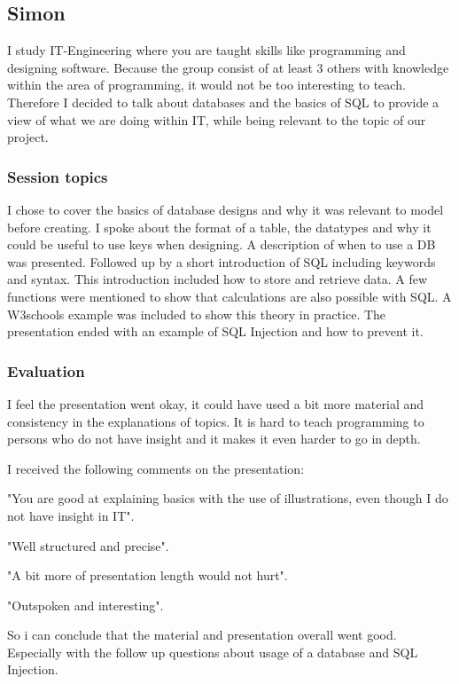 \subsection{Simon}
I study IT-Engineering where you are taught skills like programming and designing software. Because the group consist of at least 3 others with knowledge within the area of programming, it would not be too interesting to teach. Therefore I decided to talk about databases and the basics of SQL to provide a view of what we are doing within IT, while being relevant to the topic of our project.

\subsubsection{Session topics}
I chose to cover the basics of database designs and why it was relevant to model before creating.
I spoke about the format of a table, the datatypes and why it could be useful to use keys when designing.
A description of when to use a DB was presented.
Followed up by a short introduction of SQL including keywords and syntax. This introduction included how to store and retrieve data. 
A few functions were mentioned to show that calculations are also possible with SQL.
A W3schools example was included to show this theory in practice. 
The presentation ended with an example of SQL Injection and how to prevent it.

\subsubsection{Evaluation}

I feel the presentation went okay, it could have used a bit more material and consistency in the explanations of topics. It is hard to teach programming to persons who do not have insight and it makes it even harder to go in depth.

I received the following comments on the presentation:

"You are good at explaining basics with the use of illustrations, even though I do not have insight in IT".

"Well structured and precise".

"A bit more of presentation length would not hurt".

"Outspoken and interesting".

So i can conclude that the material and presentation overall went good. Especially with the follow up questions about usage of a database and SQL Injection.